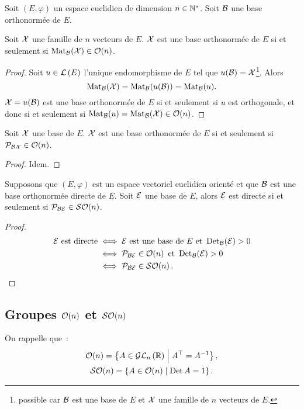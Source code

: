 Soit $(E,\varphi)$ un espace euclidien de dimension $n \in \N^*$. Soit $\B$ une base orthonormée de $E$.

\begin{prop}
  Soit $\X$ une famille de $n$ vecteurs de $E$. $\X$ est une base orthonormée de $E$ si et seulement si $\Mat_\B(\X) \in \Orth{n}$.
\end{prop}
\begin{proof}
  Soit $u \in \Endo{E}$ l'unique endomorphisme de $E$ tel que $u(\B)=\X$\footnote{possible car $\B$ est une base de $E$ et $\X$ une famille de $n$ vecteurs de $E$.}. Alors
  \begin{equation}
    \Mat_\B(\X) = \Mat_\B(u(\B))=\Mat_\B(u).
  \end{equation}
  $\X=u(\B)$ est une base orthonormée de $E$ si et seulement si $u$ est orthogonale, et donc si et seulement si $\Mat_\B(u)=\Mat_\B(\X) \in \Orth{n}$.
\end{proof}
\begin{prop}
  Soit $\X$ une base de $E$. $\X$ est une base orthonormée de $E$ si et seulement si $\P_{\B\X} \in \Orth{n}$.
\end{prop}
\begin{proof}
  Idem.
\end{proof}
\begin{prop}
  Supposons que $(E,\varphi)$ est un espace vectoriel euclidien orienté et que $\B$ est une base orthonormée directe de $E$. Soit $\E$ une base de $E$, alors $\E$ est directe si et seulement si $\P_{\B\E} \in \SOrth{n}$.
\end{prop}
\begin{proof}
  \begin{align}
    \E \text{~est directe} &\iff \E \text{~est une base de~} E \text{~et~} \Det_\B(\E) > 0 \\
    &\iff \P_{\B\E} \in \Orth{n} \text{~et~} \Det_\B(\E) > 0 \\
    &\iff \P_{\B\E} \in \SOrth{n}.
  \end{align}
\end{proof}

\subsection{Groupes $\Orth{n}$ et $\SOrth{n}$}

On rappelle que~:
\begin{gather}
  \Orth{n} = \enstq{A \in \GLn{n}{\R}}{A^\top=A^{-1}}, \\ 
  \SOrth{n}=\enstq{A \in \Orth{n}}{\Det A = 1}.
\end{gather}

